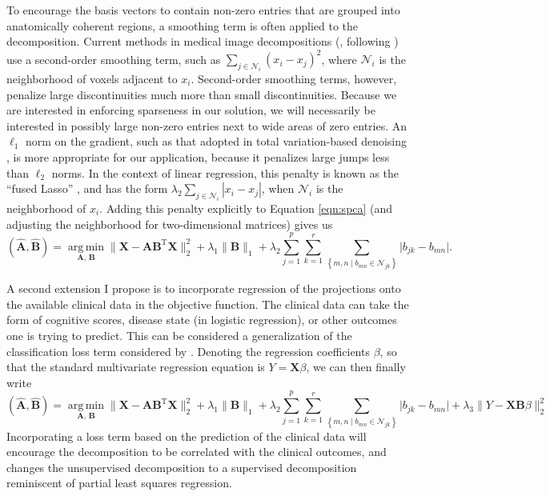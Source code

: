 \documentclass[11pt]{nih}
\begin{document}
To encourage the basis vectors to contain non-zero entries that are grouped into anatomically coherent regions, a smoothing term is often applied to the decomposition.  Current methods in medical image decompositions (\cite{batmanghelich_general_2009,hebiri_smooth-lasso_2011}, following \cite{zdunek_blind_2008}) use a second-order smoothing term, such as $\sum_{j \in \mathcal{N}_i} \left(x_i - x_j\right)^2$, where $\mathcal{N}_i$ is the neighborhood of voxels adjacent to $x_i$.  Second-order smoothing terms, however, penalize large discontinuities much more than small discontinuities.  Because we are interested in enforcing sparseness in our solution, we will necessarily be interested in possibly large non-zero entries next to wide areas of zero entries.  An $\ell_1$ norm on the gradient, such as that adopted in total variation-based denoising \cite{rudin_nonlinear_1992}, is more appropriate for our application, because it penalizes large jumps less than $\ell_2$ norms.  In the context of linear regression, this penalty is known as the ``fused Lasso'' \cite{tibshirani_sparsity_2005}, and has the form $ \lambda_2 \sum_{j \in \mathcal{N}_i} |x_i - x_j|$, when $\mathcal{N}_i$ is the neighborhood of $x_i$.  Adding this penalty explicitly to Equation \ref{eqn:spca} (and adjusting the neighborhood for two-dimensional matrices) gives us 
\begin{equation}
(\hat{\mathbf{A}},\hat{\mathbf{B}}) = \underset{\mathbf{A},\, \mathbf{B}} {\operatorname{arg\,min}}  \| \mathbf{X} - \mathbf{A} \mathbf{B}^{\mathrm{T}} \mathbf{X}\|_2^2 + \lambda_1 \| \mathbf{B}\|_1  + \lambda_2 \sum_{j=1}^p \sum_{k=1}^r \sum_{\left\lbrace m,n \mid b_{mn} \in \mathcal{N}_{jk} \right\rbrace} \vert b_{jk} -b_{mn} \vert .
\end{equation} 

A second extension I propose is to incorporate regression of the projections onto the available clinical data in the objective function.  The clinical data can take the form of cognitive scores, disease state (in logistic regression), or other outcomes one is trying to predict.  This can be considered a generalization of the classification loss term considered by \cite{batmanghelich_general_2009}.  Denoting the regression coefficients $\beta$, so that the standard multivariate regression equation is $Y = \mathbf{X} \beta$, we can then finally write 
\begin{equation}
(\hat{\mathbf{A}},\hat{\mathbf{B}}) = \underset{\mathbf{A},\, \mathbf{B}} {\operatorname{arg\,min}}  \| \mathbf{X} - \mathbf{A} \mathbf{B}^{\mathrm{T}} \mathbf{X}\|_2^2 + \lambda_1 \| \mathbf{B}\|_1  + \lambda_2 \sum_{j=1}^p \sum_{k=1}^r \sum_{\left\lbrace m,n \mid b_{mn} \in \mathcal{N}_{jk} \right\rbrace} \vert b_{jk} -b_{mn} \vert + \lambda_3 \| Y - \mathbf{XB} \beta \|_2^2
\end{equation}
Incorporating a loss term based on the prediction of the clinical data will encourage the decomposition to be correlated with the clinical outcomes, and changes the unsupervised decomposition to a supervised decomposition reminiscent of partial least squares regression.  
\end{document}
